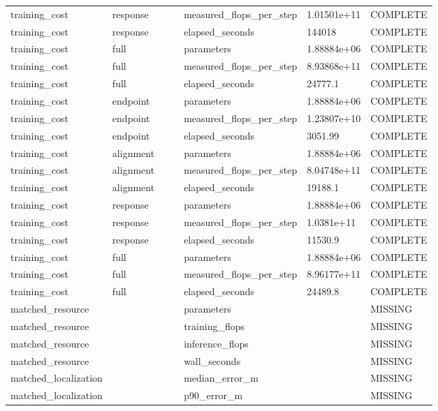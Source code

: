\begin{longtable}{lllllll}
training\_cost & response &  &  & measured\_flops\_per\_step & 1.01501e+11 & COMPLETE \\
training\_cost & response &  &  & elapsed\_seconds & 144018 & COMPLETE \\
training\_cost & full &  &  & parameters & 1.88884e+06 & COMPLETE \\
training\_cost & full &  &  & measured\_flops\_per\_step & 8.93868e+11 & COMPLETE \\
training\_cost & full &  &  & elapsed\_seconds & 24777.1 & COMPLETE \\
training\_cost & endpoint &  &  & parameters & 1.88884e+06 & COMPLETE \\
training\_cost & endpoint &  &  & measured\_flops\_per\_step & 1.23807e+10 & COMPLETE \\
training\_cost & endpoint &  &  & elapsed\_seconds & 3051.99 & COMPLETE \\
training\_cost & alignment &  &  & parameters & 1.88884e+06 & COMPLETE \\
training\_cost & alignment &  &  & measured\_flops\_per\_step & 8.04748e+11 & COMPLETE \\
training\_cost & alignment &  &  & elapsed\_seconds & 19188.1 & COMPLETE \\
training\_cost & response &  &  & parameters & 1.88884e+06 & COMPLETE \\
training\_cost & response &  &  & measured\_flops\_per\_step & 1.0381e+11 & COMPLETE \\
training\_cost & response &  &  & elapsed\_seconds & 11530.9 & COMPLETE \\
training\_cost & full &  &  & parameters & 1.88884e+06 & COMPLETE \\
training\_cost & full &  &  & measured\_flops\_per\_step & 8.96177e+11 & COMPLETE \\
training\_cost & full &  &  & elapsed\_seconds & 24489.8 & COMPLETE \\
matched\_resource &  &  &  & parameters &  & MISSING \\
matched\_resource &  &  &  & training\_flops &  & MISSING \\
matched\_resource &  &  &  & inference\_flops &  & MISSING \\
matched\_resource &  &  &  & wall\_seconds &  & MISSING \\
matched\_localization &  &  &  & median\_error\_m &  & MISSING \\
matched\_localization &  &  &  & p90\_error\_m &  & MISSING \\

\end{longtable}

